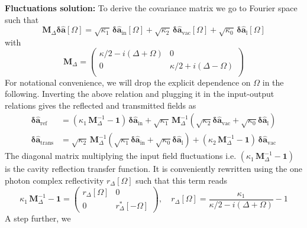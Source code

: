 \noindent \textbf{Fluctuations solution: }To derive the covariance matrix we go to Fourier space such that 
\begin{equation}
     \mathbf{M}_\Delta \mathbf{\delta \hat{a}}[\Omega]  = \sqrt{\kappa_{\mathrm{1}}} \, \mathbf{\delta \hat{a}_{\mathrm{in}}}[\Omega]  + \sqrt{\kappa_2} \, \mathbf{\delta \hat{a}_{\mathrm{vac}}}[\Omega]   + \sqrt{\kappa_0} \, \mathbf{\delta \hat{a}_{\mathrm{l}}}[\Omega]   
\end{equation}
with 
\begin{equation*}
  \mathbf{M}_\Delta =\begin{pmatrix}
  \kappa/2-i(\Delta+\Omega) & 0 \\ 
  0 & \kappa/2+i(\Delta-\Omega)\\ 
  \end{pmatrix} 
\end{equation*}
For notational convenience, we will drop the explicit dependence on $\Omega$ in the following. Inverting the above relation and plugging it in the input-output relations gives the reflected and transmitted fields as
\begin{equation}
  \begin{split}
  \mathbf{\delta \hat{a}_{\mathrm{ref}}}  &= ( \kappa_1 \, \mathbf{M}^{-1}_\Delta - \mathbf{1} )\, \mathbf{\delta \hat{a}_{\mathrm{in}}} +  \sqrt{\kappa_1} \,\mathbf{M}^{-1}_\Delta (\sqrt{\kappa_2} \mathbf{\delta \hat{a}_{\mathrm{vac}}} + \sqrt{\kappa_0}  \mathbf{\delta \hat{a}_{\mathrm{l}}} ) \\
  \mathbf{\delta \hat{a}_{\mathrm{trans}}} & =  \sqrt{\kappa_2} \,\mathbf{M}^{-1}_\Delta (\sqrt{\kappa_1} \mathbf{\delta \hat{a}_{\mathrm{in}}} + \sqrt{\kappa_0}  \mathbf{\delta \hat{a}_{\mathrm{l}}} ) +  (\kappa_2 \,\mathbf{M}^{-1}_\Delta - \mathbf{1}) \, \mathbf{\delta \hat{a}_{\mathrm{vac}}}
  \end{split}
\end{equation}
The diagonal matrix multiplying the input field fluctuations i.e. $( \kappa_1 \, \mathbf{M}^{-1}_\Delta - \mathbf{1} )$ is the cavity reflection transfer function. It is conveniently rewritten using the one photon complex reflectivity $r_\Delta [\Omega]$ such that this term reads
\begin{equation*}
  \kappa_1 \, \mathbf{M}^{-1}_\Delta - \mathbf{1} = \begin{pmatrix}
  r_\Delta[\Omega] & 0 \\
  0 & r_\Delta^{*}[-\Omega]
  \end{pmatrix}, \quad r_\Delta[\Omega] = \frac{\kappa_1}{\kappa/2 - i(\Delta + \Omega)} - 1 
\end{equation*}
A step further, we 

